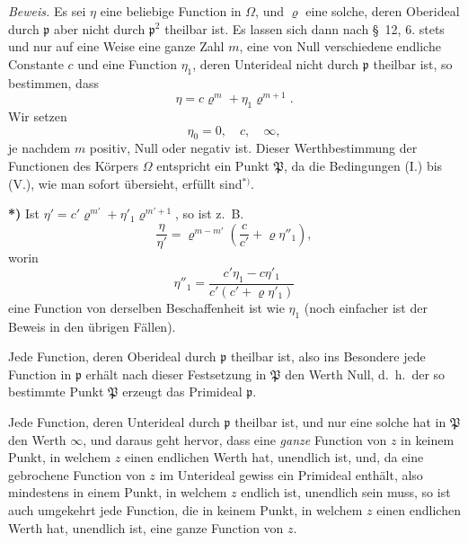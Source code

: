 \documentclass{article}
\begin{document}
\emph{Beweis.} Es sei $\eta$ eine beliebige Function in $\Omega$, und $\varrho$ eine solche, deren Oberideal durch $\mathfrak{p}$ aber nicht durch $\mathfrak{p}^{2}$ theilbar ist. Es lassen sich dann nach §~12, 6. stets und nur auf eine Weise eine ganze Zahl $m$, eine von Null verschiedene endliche Constante $c$ und eine Function $\eta_{1}$, deren Unterideal nicht durch $\mathfrak{p}$ theilbar ist, so bestimmen, dass
\[ \eta = c\varrho^{m} + \eta_{1}\varrho^{m+1}. \]
Wir setzen
\[ \eta_{0} = 0, \quad c, \quad \infty, \]
je nachdem $m$ positiv, Null oder negativ ist. Dieser Werthbestimmung der Functionen des Körpers $\Omega$ entspricht ein Punkt $\mathfrak{P}$, da die Bedingungen (I.) bis (V.), wie man sofort übersieht, erfüllt sind${}^{*)}$.

\textbf{*)} Ist $\eta' = c'\varrho^{m'} + \eta'_{1}\varrho^{m'+1}$, so ist z.\ B.
\[ \frac{\eta}{\eta'} = \varrho^{m-m'}\left(\frac{c}{c'} + \varrho\eta''_{1}\right), \]
worin
\[ \eta''_{1} = \frac{c'\eta_{1} - c\eta'_{1}}{c'(c' + \varrho\eta'_{1})} \]
eine Function von derselben Beschaffenheit ist wie $\eta_{1}$ (noch einfacher ist der Beweis in den übrigen Fällen).


Jede Function, deren Oberideal durch $\mathfrak{p}$ theilbar ist, also ins Besondere jede Function in $\mathfrak{p}$ erhält nach dieser Festsetzung in $\mathfrak{P}$ den Werth Null, d.\ h.\ der so bestimmte Punkt $\mathfrak{P}$ erzeugt das Primideal $\mathfrak{p}$.

Jede Function, deren Unterideal durch $\mathfrak{p}$ theilbar ist, und nur eine solche hat in $\mathfrak{P}$ den Werth $\infty$, und daraus geht hervor, dass eine \emph{ganze} Function von $z$ in keinem Punkt, in welchem $z$ einen endlichen Werth hat, unendlich ist, und, da eine gebrochene Function von $z$ im Unterideal gewiss ein Primideal enthält, also mindestens in einem Punkt, in welchem $z$ endlich ist, unendlich sein muss, so ist auch umgekehrt jede Function, die in keinem Punkt, in welchem $z$ einen endlichen Werth hat, unendlich ist, eine ganze Function von $z$.
\end{document}
